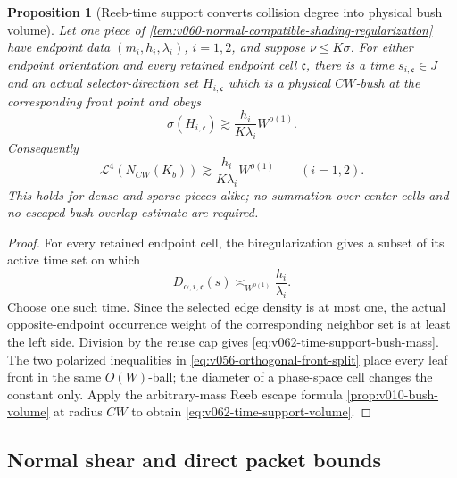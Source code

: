 \documentclass[10pt]{article}
\newtheorem{proposition}[theorem]{Proposition}
\begin{document}
\begin{proposition}[Reeb-time support converts collision degree into physical bush volume]
\label{prop:v062-time-support-bush-volume}
Let one piece of
\cref{lem:v060-normal-compatible-shading-regularization} have endpoint data
\((m_i,h_i,\lambda_i)\), \(i=1,2\), and suppose
\(\nu\le K\sigma\).  For either endpoint orientation and every retained endpoint cell
\(\mathfrak c\), there is a time \(s_{i,\mathfrak c}\in J\) and an actual selector-direction set
\(H_{i,\mathfrak c}\) which is a physical \(CW\)-bush at the corresponding front point and obeys
\begin{equation}
\label{eq:v062-time-support-bush-mass}
\boxed{
\sigma(H_{i,\mathfrak c})
\gtrsim
\frac{h_i}{K\lambda_i}
W^{o(1)}.
}
\end{equation}
Consequently
\begin{equation}
\label{eq:v062-time-support-volume}
\boxed{
\mathcal L^4\!\left(N_{CW}(K_b)\right)
\gtrsim
\frac{h_i}{K\lambda_i}
W^{o(1)}
\qquad(i=1,2).
}
\end{equation}
This holds for dense and sparse pieces alike; no summation over center cells and no escaped-bush
overlap estimate are required.
\end{proposition}

\begin{proof}
For every retained endpoint cell, the biregularization gives a subset of its active time set on
which
\[
D_{\alpha,i,\mathfrak c}(s)
\asymp_{W^{o(1)}}
\frac{h_i}{\lambda_i}.
\]
Choose one such time.  Since the selected edge density is at most one, the actual opposite-endpoint
occurrence weight of the corresponding neighbor set is at least the left side.  Division by the
reuse cap gives \eqref{eq:v062-time-support-bush-mass}.  The two polarized inequalities in
\eqref{eq:v056-orthogonal-front-split} place every leaf front in the same \(O(W)\)-ball; the diameter
of a phase-space cell changes the constant only.  Apply the arbitrary-mass Reeb escape formula
\cref{prop:v010-bush-volume} at radius \(CW\) to obtain
\eqref{eq:v062-time-support-volume}.
\end{proof}

\subsection{Normal shear and direct packet bounds}
\end{document}

